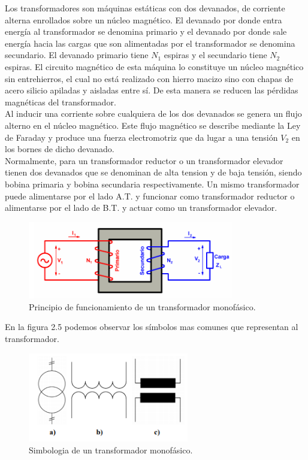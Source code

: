 Los transformadores son máquinas estáticas con dos devanados, de corriente alterna enrollados sobre un núcleo magnético. El devanado por donde entra energía al transformador se denomina primario y el devanado por donde sale energía hacia las cargas que son alimentadas por el transformador se denomina secundario. El devanado primario tiene $N_{1}$ espiras y el secundario tiene $N_{2}$ espiras. El circuito magnético de esta máquina lo constituye un núcleo magnético sin entrehierros, el cual no está realizado con hierro macizo sino con chapas de acero silicio apiladas y aisladas entre sí. De esta manera se reducen las pérdidas magnéticas del transformador.\\

Al inducir una corriente sobre cualquiera de los dos devanados se genera un flujo alterno en el núcleo magnético. Este flujo magnético se describe mediante la Ley de Faraday y produce una fuerza electromotriz que da lugar a una tensión $V_{2}$ en los bornes de dicho devanado.\\

Normalmente, para un transformador reductor o un transformador elevador tienen dos devanados que se denominan de alta tension y de baja tensión, siendo bobina primaria y bobina secundaria respectivamente. Un mismo transformador puede alimentarse por el lado A.T. y funcionar como transformador reductor o alimentarse por el lado de B.T. y actuar como un transformador elevador.

\begin{figure}[H]
\centering
\includegraphics[width=9cm]{capitulo3/figs/trans.png}
\caption{ Principio de funcionamiento de un transformador monofásico.}
\end{figure}

En la figura 2.5 podemos observar los símbolos mas comunes que representan al transformador. 

\begin{figure}[H]
\centering
\includegraphics[width=7cm]{capitulo3/figs/simbolos.png}
\caption{ Simbologia de un transformador monofásico.}
\end{figure}

